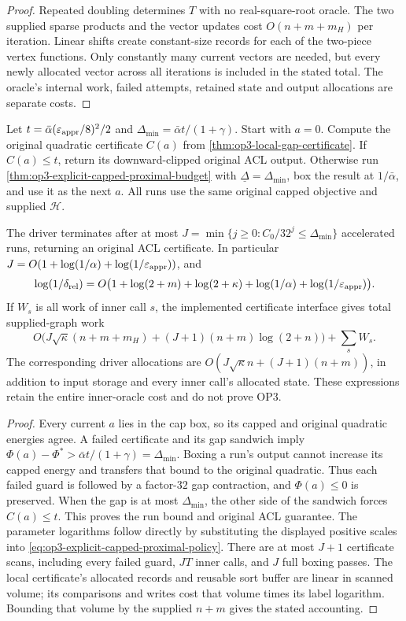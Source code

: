 \begin{proof}
Repeated doubling determines $T$ with no real-square-root oracle.
The two supplied sparse products and the vector updates cost
$O(n+m+m_H)$ per iteration. Linear shifts create constant-size records
for each of the two-piece vertex functions. Only constantly many current
vectors are needed, but every newly allocated vector across all iterations
is included in the stated total. The oracle's internal work, failed
attempts, retained state and output allocations are separate costs.
\end{proof}

\begin{corollary}
\label{cor:op3-capped-certified-restart-driver}
Let $t=\bar\alpha(\varepsilon_{\mathrm{appr}}/8)^2/2$ and
$\Delta_{\min}=\bar\alpha t/(1+\gamma)$. Start with $a=0$.
Compute the original quadratic certificate $C(a)$ from
\cref{thm:op3-local-gap-certificate}. If $C(a)\leq t$, return its
downward-clipped original ACL output. Otherwise run
\cref{thm:op3-explicit-capped-proximal-budget} with
$\underline\Delta=\Delta_{\min}$, box the result at $1/\bar\alpha$,
and use it as the next $a$. All runs use the same original capped
objective and supplied $\mathcal H$.

The driver terminates after at most
$J=\min\{j\geq0:C_0/32^j\leq\Delta_{\min}\}$ accelerated runs,
returning an original ACL certificate. In particular
$J=O(1+\log(1/\alpha)+\log(1/\varepsilon_{\mathrm{appr}}))$, and
\[
 \log(1/\delta_{\rm rel})
 =O\bigl(1+\log(2+m)+\log(2+\kappa)
            +\log(1/\alpha)+\log(1/\varepsilon_{\mathrm{appr}})\bigr).
\]
If $W_s$ is all work of inner call $s$, the implemented certificate interface
gives total supplied-graph work
\[
 O\bigl(J\sqrt\kappa(n+m+m_H)
       +(J+1)(n+m)\log(2+n)\bigr)+\sum_s W_s.
\]
The corresponding driver allocations are $O(J\sqrt\kappa n+(J+1)(n+m))$,
in addition to input storage and every inner call's allocated state.
These expressions retain the entire inner-oracle cost and do not prove OP3.
\end{corollary}
\begin{proof}
Every current $a$ lies in the cap box, so its capped and original quadratic
energies agree. A failed certificate and its gap sandwich imply
$\Phi(a)-\Phi^*>\bar\alpha t/(1+\gamma)=\Delta_{\min}$.
Boxing a run's output cannot increase its capped energy and transfers that
bound to the original quadratic. Thus each failed guard is followed by
a factor-$32$ gap contraction, and $\Phi(a)\leq0$ is preserved.
When the gap is at most $\Delta_{\min}$, the other side of the sandwich
forces $C(a)\leq t$. This proves the run bound and original ACL guarantee.
The parameter logarithms follow directly by substituting the displayed
positive scales into \eqref{eq:op3-explicit-capped-proximal-policy}.
There are at most $J+1$ certificate scans, including every failed guard,
$JT$ inner calls, and $J$ full boxing passes. The local certificate's
allocated records and reusable sort buffer are linear in scanned volume;
its comparisons and writes cost that volume times its label logarithm.
Bounding that volume by the supplied $n+m$ gives the stated accounting.
\end{proof}

